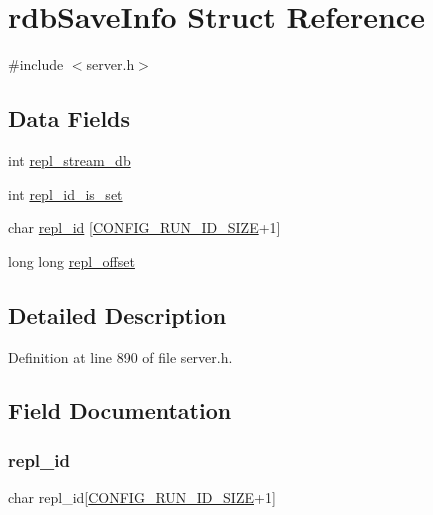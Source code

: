 \hypertarget{structrdb_save_info}{}\section{rdb\+Save\+Info Struct Reference}
\label{structrdb_save_info}


{\ttfamily \#include $<$server.\+h$>$}

\subsection*{Data Fields}
\begin{DoxyCompactItemize}
\item 
int \hyperlink{structrdb_save_info_a839a288ca668f38e63ba0fd17f6ae8c5}{repl\+\_\+stream\+\_\+db}
\item 
int \hyperlink{structrdb_save_info_aaceb90ef64847700ff5b9c91df9d7bf5}{repl\+\_\+id\+\_\+is\+\_\+set}
\item 
char \hyperlink{structrdb_save_info_af57b6e90af7dbfc2dd62eb2d903437bf}{repl\+\_\+id} \mbox{[}\hyperlink{server_8h_aba6794fa3ee28f85165eaed93190f1df}{C\+O\+N\+F\+I\+G\+\_\+\+R\+U\+N\+\_\+\+I\+D\+\_\+\+S\+I\+ZE}+1\mbox{]}
\item 
long long \hyperlink{structrdb_save_info_acaaa973071b682ff89c70991a2d3ce7a}{repl\+\_\+offset}
\end{DoxyCompactItemize}


\subsection{Detailed Description}


Definition at line 890 of file server.\+h.



\subsection{Field Documentation}
\mbox{\label{structrdb_save_info_af57b6e90af7dbfc2dd62eb2d903437bf}} 
\subsubsection{\texorpdfstring{repl\+\_\+id}{repl\_id}}
{\footnotesize\ttfamily char repl\+\_\+id\mbox{[}\hyperlink{server_8h_aba6794fa3ee28f85165eaed93190f1df}{C\+O\+N\+F\+I\+G\+\_\+\+R\+U\+N\+\_\+\+I\+D\+\_\+\+S\+I\+ZE}+1\mbox{]}}




